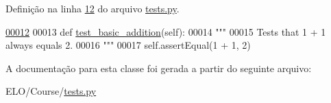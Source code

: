 Definição na linha \hyperlink{Course_2tests_8py_source_l00012}{12} do arquivo \hyperlink{Course_2tests_8py_source}{tests.\-py}.


\begin{DoxyCode}
\hypertarget{classCourse_1_1tests_1_1SimpleTest_l00012}{}\hyperlink{classCourse_1_1tests_1_1SimpleTest_aa407be04c43ee2e157abf2cc03dd6806}{00012} 
00013     \textcolor{keyword}{def }\hyperlink{classCourse_1_1tests_1_1SimpleTest_aa407be04c43ee2e157abf2cc03dd6806}{test\_basic\_addition}(self):
00014         \textcolor{stringliteral}{"""}
00015 \textcolor{stringliteral}{        Tests that 1 + 1 always equals 2.}
00016 \textcolor{stringliteral}{        """}
00017         self.assertEqual(1 + 1, 2)
\end{DoxyCode}


A documentação para esta classe foi gerada a partir do seguinte arquivo\-:\begin{DoxyCompactItemize}
\item 
E\-L\-O/\-Course/\hyperlink{Course_2tests_8py}{tests.\-py}\end{DoxyCompactItemize}
